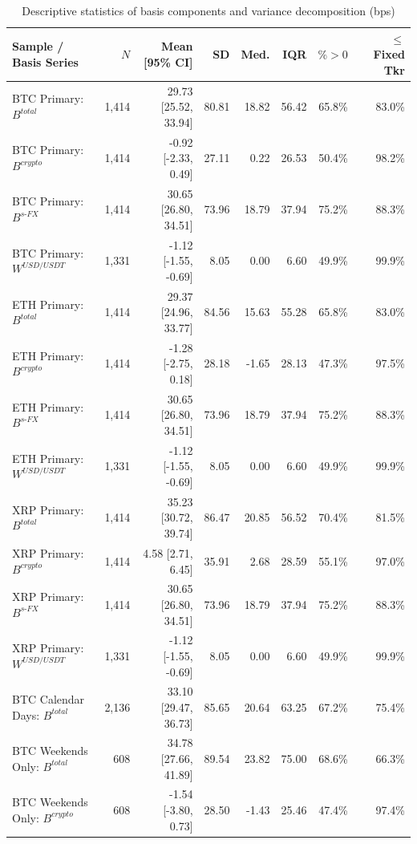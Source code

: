 \begin{table}[htbp]
\centering
\caption{Descriptive statistics of basis components and variance decomposition (bps)}
\label{tab:descriptive}
\fontsize{6.8}{8}\selectfont\setlength{\tabcolsep}{1.8pt}
\begingroup
\begin{tabular}{@{}>{\raggedright\arraybackslash}p{2.6cm}rrrrrrr@{}}
\toprule
Sample / Basis Series & $N$ & Mean [95\% CI] & SD & Med. & IQR & $\%>0$ & $\le$ Fixed Tkr \\
\midrule
BTC Primary: $B^{total}$ & 1,414 & 29.73 [25.52, 33.94] & 80.81 & 18.82 & 56.42 & 65.8\% & 83.0\% \\
BTC Primary: $B^{crypto}$ & 1,414 & -0.92 [-2.33, 0.49] & 27.11 & 0.22 & 26.53 & 50.4\% & 98.2\% \\
BTC Primary: $B^{s\text{-}FX}$ & 1,414 & 30.65 [26.80, 34.51] & 73.96 & 18.79 & 37.94 & 75.2\% & 88.3\% \\
BTC Primary: $W^{USD/USDT}$ & 1,331 & -1.12 [-1.55, -0.69] & 8.05 & 0.00 & 6.60 & 49.9\% & 99.9\% \\
ETH Primary: $B^{total}$ & 1,414 & 29.37 [24.96, 33.77] & 84.56 & 15.63 & 55.28 & 65.8\% & 83.0\% \\
ETH Primary: $B^{crypto}$ & 1,414 & -1.28 [-2.75, 0.18] & 28.18 & -1.65 & 28.13 & 47.3\% & 97.5\% \\
ETH Primary: $B^{s\text{-}FX}$ & 1,414 & 30.65 [26.80, 34.51] & 73.96 & 18.79 & 37.94 & 75.2\% & 88.3\% \\
ETH Primary: $W^{USD/USDT}$ & 1,331 & -1.12 [-1.55, -0.69] & 8.05 & 0.00 & 6.60 & 49.9\% & 99.9\% \\
XRP Primary: $B^{total}$ & 1,414 & 35.23 [30.72, 39.74] & 86.47 & 20.85 & 56.52 & 70.4\% & 81.5\% \\
XRP Primary: $B^{crypto}$ & 1,414 & 4.58 [2.71, 6.45] & 35.91 & 2.68 & 28.59 & 55.1\% & 97.0\% \\
XRP Primary: $B^{s\text{-}FX}$ & 1,414 & 30.65 [26.80, 34.51] & 73.96 & 18.79 & 37.94 & 75.2\% & 88.3\% \\
XRP Primary: $W^{USD/USDT}$ & 1,331 & -1.12 [-1.55, -0.69] & 8.05 & 0.00 & 6.60 & 49.9\% & 99.9\% \\
BTC Calendar Days: $B^{total}$ & 2,136 & 33.10 [29.47, 36.73] & 85.65 & 20.64 & 63.25 & 67.2\% & 75.4\% \\
BTC Weekends Only: $B^{total}$ & 608 & 34.78 [27.66, 41.89] & 89.54 & 23.82 & 75.00 & 68.6\% & 66.3\% \\
BTC Weekends Only: $B^{crypto}$ & 608 & -1.54 [-3.80, 0.73] & 28.50 & -1.43 & 25.46 & 47.4\% & 97.4\% \\

\end{tabular}
\end{table}
